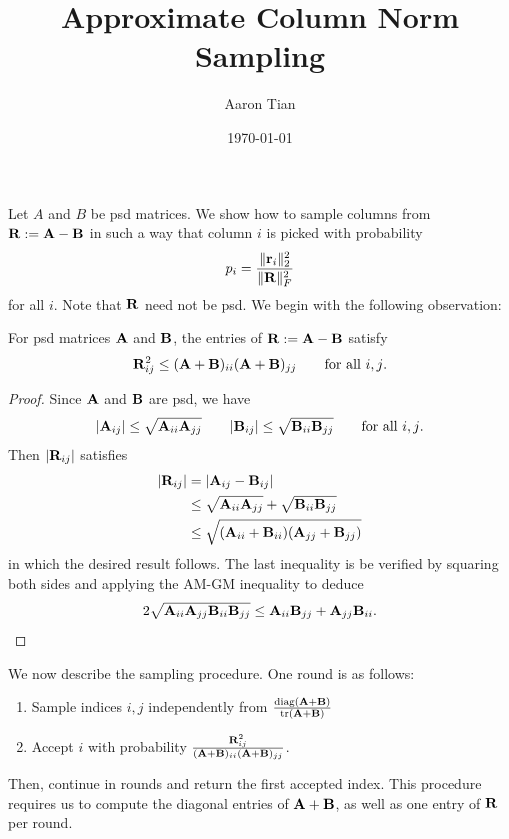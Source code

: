 \documentclass{article}
\title{Approximate Column Norm Sampling}
\author{Aaron Tian}
\date{\today}
\begin{document}
% 
\maketitle



Let $A$ and $B$ be psd matrices. We show how to sample columns from $\mathbf{R} := \mathbf{A} - \mathbf{B}$ in such a way that column $i$ is picked with probability
\[p_i = \frac{\|\mathbf{r}_i\|^2_2}{\|\mathbf{R}\|^2_F}\]
for all $i$. Note that $\mathbf{R}$ need not be psd. We begin with the following observation:
\begin{lemma}
    For psd matrices $\mathbf{A}$ and $\mathbf{B}$, the entries of $\mathbf{R} := \mathbf{A} - \mathbf{B}$ satisfy
    \[\mathbf{R}_{ij}^2\leq (\mathbf{A} + \mathbf{B})_{ii}(\mathbf{A} + \mathbf{B})_{jj}\qquad\text{for all $i,j$.}\]
\end{lemma}

\begin{proof}
    Since $\mathbf{A}$ and $\mathbf{B}$ are psd, we have
    \[|\mathbf{A}_{ij}|\leq \sqrt{\mathbf{A}_{ii}\mathbf{A}_{jj}}\qquad |\mathbf{B}_{ij}|\leq \sqrt{\mathbf{B}_{ii}\mathbf{B}_{jj}}\qquad\text{for all $i,j$.}\]
    Then $|\mathbf{R}_{ij}|$ satisfies
    \begin{align*}
        |\mathbf{R}_{ij}| &= |\mathbf{A}_{ij} - \mathbf{B}_{ij}|\\
        &\leq \sqrt{\mathbf{A}_{ii}\mathbf{A}_{jj}} + \sqrt{\mathbf{B}_{ii}\mathbf{B}_{jj}}\\
        &\leq\sqrt{(\mathbf{A}_{ii} + \mathbf{B}_{ii})(\mathbf{A}_{jj} + \mathbf{B}_{jj})}
    \end{align*}
    in which the desired result follows. The last inequality is be verified by squaring both sides and applying the AM-GM inequality to deduce
    \[2\sqrt{\mathbf{A}_{ii}\mathbf{A}_{jj}\mathbf{B}_{ii}\mathbf{B}_{jj}}\leq \mathbf{A}_{ii}\mathbf{B}_{jj} + \mathbf{A}_{jj}\mathbf{B}_{ii}.\]
\end{proof}

We now describe the sampling procedure. One round is as follows:
\begin{enumerate}
    \item Sample indices $i,j$ independently from $\frac{\operatorname*{diag}(\mathbf{A} + \mathbf{B})}{\tr(\mathbf{A} + \mathbf{B})}$
    \item Accept $i$ with probability $\frac{\mathbf{R}_{ij}^2}{(\mathbf{A}+\mathbf{B})_{ii}(\mathbf{A}+\mathbf{B})_{jj}}$.
\end{enumerate}
Then, continue in rounds and return the first accepted index. This procedure requires us to compute the diagonal entries of $\mathbf{A} + \mathbf{B}$, as well as one entry of $\mathbf{R}$ per round. 
\end{document}
